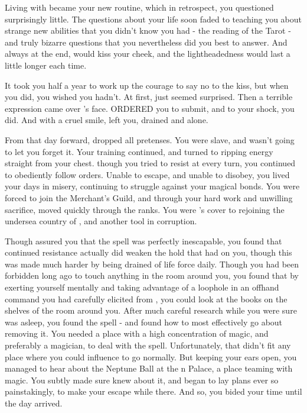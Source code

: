 \documentclass[char]{NeptuneBall}
\begin{document}
Living with \cWitch{\them} became your new routine, which in retrospect, you questioned surprisingly little. The questions about your life soon faded to \cWitch{\them} teaching you about strange new abilities that you didn't know you had - the reading of the Tarot - and truly bizarre questions that you nevertheless did you best to answer. And always at the end, \cWitch{\they} would kiss your cheek, and the lightheadedness would last a little longer each time.

It took you half a year to work up the courage to say no to the kiss, but when you did, you wished you hadn't. At first, \cWitch{\they} just seemed surprised. Then a terrible expression came over \cWitch{\their}'s face. \cWitch{} ORDERED you to submit, and to your shock, you did. And with a cruel smile, \cWitch{\they} left you, drained and alone.

From that day forward, \cWitch{} dropped all pretenses. You were \cWitch{\their} slave, and \cWitch{\they} wasn't going to let you forget it. Your training continued, and \cWitch{\they} turned to ripping energy straight from your chest. though you tried to resist \cWitch{\them} at every turn, you continued to obediently follow orders. Unable to escape, and unable to disobey, you lived your days in misery, continuing to struggle against your magical bonds. You were forced to join the Merchant's Guild, and through your hard work and unwilling sacrifice, moved quickly through the ranks. You were \cWitch{}'s cover to rejoining the undersea country of \pAtlantis{}, and another tool in \cWitch{\their} corruption.

Though \cWitch{\they} assured you that the spell was perfectly inescapable, you found that continued resistance actually did weaken the hold that \cWitch{\they} had on you, though this was made much harder by being drained of life force daily. Though you had been forbidden long ago to touch anything in the room around you, you found that by exerting yourself mentally and taking advantage of a loophole in an offhand command you had carefully elicited from \cWitch{\them}, you could look at the books on the shelves of the room around you. After much careful research while you were sure \cWitch{} was asleep, you found the spell - and found how to most effectively go about removing it. You needed a place with a high concentration of magic, and preferably a magician, to deal with the spell. Unfortunately, that didn't fit any place where you could influence \cWitch{} to go normally. But keeping your ears open, you managed to hear about the Neptune Ball at the \pAtlantis{}n Palace, a place teaming with magic. You subtly made sure \cWitch{} knew about it, and began to lay plans ever so painstakingly, to make your escape while there. And so, you bided your time until the day arrived.
\end{document}

